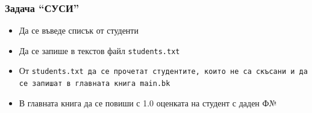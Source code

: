\documentclass{beamer}
\begin{document}
\begin{frame}
  \frametitle{Задача ``СУСИ''}

  \begin{itemize}
  \item Да се въведе списък от студенти
  \item Да се запише в текстов файл \tt{students.txt}
  \item От \tt{students.txt} да се прочетат студентите, които не са скъсани и да се запишат в главната книга \tt{main.bk}
  \item В главната книга да се повиши с 1.0 оценката на студент с даден Ф№
  \end{itemize}
\end{frame}
\end{document}
